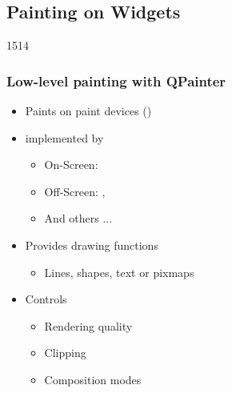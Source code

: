 %
%
%
%

\subsection{Painting on Widgets}

\begin{slide}{1514}\frametitle{Low-level painting with QPainter}
  \begin{itemize}
  \item Paints on paint devices ()
  \item {} implemented by
    \begin{itemize}
    \item On-Screen: 
    \item Off-Screen: , 
    \item And others ...
    \end{itemize}
  \item Provides drawing functions
    \begin{itemize}
    \item Lines, shapes, text or pixmaps
    \end{itemize}
  \item Controls
    \begin{itemize}
    \item Rendering quality
    \item Clipping
    \item Composition modes
    \end{itemize}
  \end{itemize}
\end{slide}

